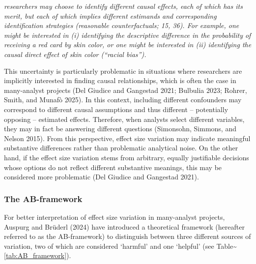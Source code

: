\documentclass[
  letterpaper,
  DIV=11,
  numbers=noendperiod]{scrartcl}
\begin{document}
\emph{researchers may choose to identify different causal effects, each
of which has its merit, but each of which implies different estimands
and corresponding identification strategies (reasonable counterfactuals;
15, 36). For example, one might be interested in (i) identifying the
descriptive difference in the probability of receiving a red card by
skin color, or one might be interested in (ii) identifying the causal
direct effect of skin color (``racial bias'').}

This uncertainty is particularly problematic in situations where
researchers are implicitly interested in finding causal relationships,
which is often the case in many-analyst projects (Del Giudice and
Gangestad 2021; Bulbulia 2023; Rohrer, Smith, and Munafò 2025). In this
context, including different confounders may correspond to different
causal assumptions and thus different -- potentially opposing --
estimated effects. Therefore, when analysts select different variables,
they may in fact be answering different questions (Simonsohn, Simmons,
and Nelson 2015). From this perspective, effect size variation may
indicate meaningful substantive differences rather than problematic
analytical noise. On the other hand, if the effect size variation stems
from arbitrary, equally justifiable decisions whose options do not
reflect different substantive meanings, this may be considered more
problematic (Del Giudice and Gangestad 2021).

\subsubsection{The AB-framework}\label{the-ab-framework}

For better interpretation of effect size variation in many-analyst
projects, Auspurg and Brüderl (2024) have introduced a theoretical
framework (hereafter referred to as the AB-framework) to distinguish
between three different sources of variation, two of which are
considered `harmful' and one `helpful' (see
Table\textasciitilde{}\ref{tab:AB_framework}).
\end{document}
